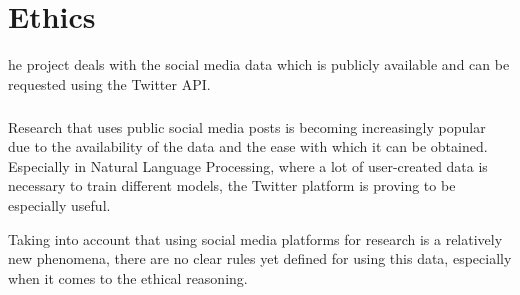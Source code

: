 \let\textcircled=\pgftextcircled
\chapter{Ethics}
\label{chap:ethics}

he project deals with the social media data which is publicly available and can be requested using the Twitter API. 
\paragraph{} Research that uses public social media posts is becoming increasingly popular due to the availability of the data and the ease with which it can be obtained. Especially in Natural Language Processing, where a lot of user-created data is necessary to train different models, the Twitter platform is proving to be especially useful. 

Taking into account that using social media platforms for research is a relatively new phenomena, there are no clear rules yet defined for using this data, especially when it comes to the ethical reasoning. 